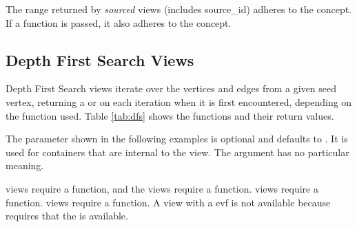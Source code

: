 The range returned by \textit{sourced} views (includes source\_id) adheres to the   concept. If a 
 function is passed, it also adheres to the  concept.

\subsection{Depth First Search Views}

Depth First Search views iterate over the vertices and edges from a given seed vertex, returning a  or  on each iteration when it is first encountered, depending on the function used. 
Table \ref{tab:dfs} shows the functions and their return values.

The  parameter shown in the following examples is optional and defaults to . It is used for containers 
that are internal to the view. The  argument has no particular meaning.

 views require a  function, and the  views require a  function.
 views require a  function.  views require a  function. 
A  view with a evf is not available because  requires that the  is available.



